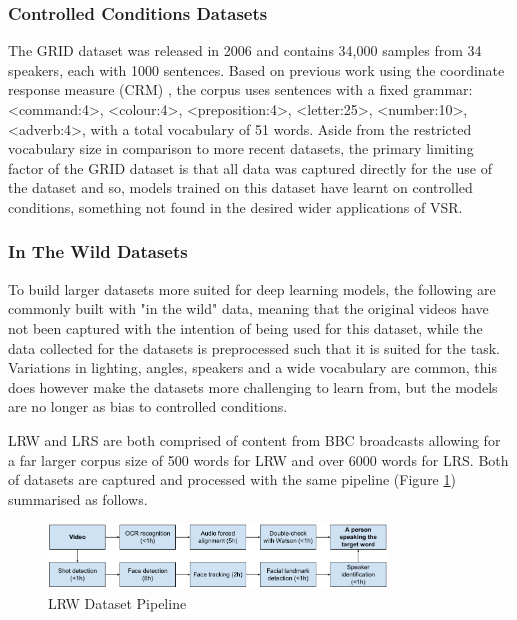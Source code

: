 \documentclass[12pt]{report}
\begin{document}
\subsubsection{Controlled Conditions Datasets}
The GRID dataset was released in 2006 \cite{Cooke2006} and contains 34,000 samples from 34 speakers, each with 1000 sentences.
Based on previous work using the coordinate response measure (CRM) \cite{Bolia2000}, the corpus uses sentences with a fixed grammar: <command:4>, <colour:4>, <preposition:4>, <letter:25>, <number:10>, <adverb:4>, with a total vocabulary of 51 words.
Aside from the restricted vocabulary size in comparison to more recent datasets, the primary limiting factor of the GRID dataset is that all data was captured directly for the use of the dataset and so, models trained on this dataset have learnt on controlled conditions, something not found in the desired wider applications of VSR.

\subsubsection{In The Wild Datasets}
To build larger datasets more suited for deep learning models, the following are commonly built with "in the wild" data, meaning that the original videos have not been captured with the intention of being used for this dataset, while the data collected for the datasets is preprocessed such that it is suited for the task.
Variations in lighting, angles, speakers and a wide vocabulary are common, this does however make the datasets more challenging to learn from, but the models are no longer as bias to controlled conditions.

LRW and LRS are both comprised of content from BBC broadcasts \cite{Chung2016, Chung2017} allowing for a far larger corpus size of 500 words for LRW and over 6000 words for LRS.
Both of datasets are captured and processed with the same pipeline (Figure \ref{fig:LRW_Pipeline}) summarised as follows. 

\begin{figure}[h]
    \centering
        \includegraphics[width=0.8\textwidth]{figures/lrw_pipeline.png}
    \caption{LRW Dataset Pipeline \cite{Chung2016}}\label{fig:LRW_Pipeline}
\end{figure}
\end{document}
